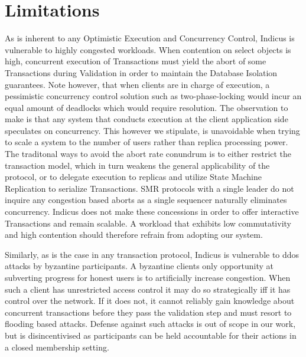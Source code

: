 \section{Limitations}
As is inherent to any Optimistic Execution and Concurrency Control, Indicus is vulnerable to highly congested workloads. When contention on select objects is high, concurrent execution of Transactions must yield the abort of some Transactions during Validation in order to maintain the Database Isolation guarantees. Note however, that when clients are in charge of execution, a pessimistic concurrency control solution such as two-phase-locking would incur an equal amount of deadlocks which would require resolution. The observation to make is that any system that conducts execution at the client application side speculates on concurrency. This however we stipulate, is unavoidable when trying to scale a system to the number of users rather than replica processing power. The traditonal ways to avoid the abort rate conundrum is to either restrict the transaction model, which in turn weakens the general applicability of the protocol, or to delegate execution to replicas and utilize State Machine Replication to serialize Transactions. SMR protocols with a single leader do not inquire any congestion based aborts as a single sequencer naturally eliminates concurrency.
Indicus does not make these concessions in order to offer interactive Transactions and remain scalable. A workload that exhibits low commutativity and high contention should therefore refrain from adopting our system.

Similarly, as is the case in any transaction protocol, Indicus is vulnerable to ddos attacks by byzantine participants. A byzantine clients only opportunity at subverting progress for honest users is to artificially increase congestion. When such a client has unrestricted access control it may do so strategically iff it has control over the network. If it does not, it cannot reliably gain knowledge about concurrent transactions before they pass the validation step and must resort to flooding based attacks. Defense against such attacks is out of scope in our work, but is disincentivised as participants can be held accountable for their actions in a closed membership setting.



